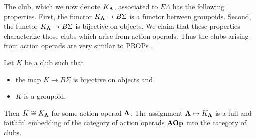 The club, which we now denote $K_{\mathbf{\Lambda}}$, associated to $E\Lambda$ has the following properties. First, the functor $K_{\mathbf{\Lambda}} \rightarrow B\Sigma$ is a functor between groupoids. Second, the functor $K_{\mathbf{\Lambda}} \rightarrow B\Sigma$ is  bijective-on-objects. We claim that these properties characterize those clubs which arise from action operads. Thus the clubs arising from action operads are very similar to PROPs \cite{mac_prop, markl_prop}.

\begin{thm}\label{thm:club=operad}
Let $K$ be a club such that
\begin{itemize}
\item the map $K \rightarrow B\Sigma$ is bijective on objects and
\item $K$ is a groupoid.
\end{itemize}
Then $K \cong K_{\mathbf{\Lambda}}$ for some action operad $\mathbf{\Lambda}$. The assignment $\mathbf{\Lambda} \mapsto K_{\mathbf{\Lambda}}$ is a full and faithful embedding of the category of action operads $\mathbf{AOp}$ into the category of clubs.
\end{thm}
